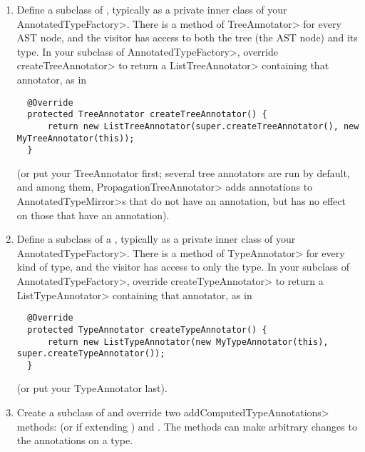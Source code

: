 \begin{enumerate}
\item
  Define a subclass of
  ,
  typically as a private inner class of your \<AnnotatedTypeFactory>.
  There is a method of \<TreeAnnotator> for every AST node, and the visitor
  has access to both the tree (the AST node) and its type.  In your
  subclass of \<AnnotatedTypeFactory>, override \<createTreeAnnotator> to
  return a \<ListTreeAnnotator> containing that annotator, as in

\begin{Verbatim}
  @Override
  protected TreeAnnotator createTreeAnnotator() {
      return new ListTreeAnnotator(super.createTreeAnnotator(), new MyTreeAnnotator(this));
  }
\end{Verbatim}

  \noindent
  (or put your TreeAnnotator first; several tree annotators are run by
  default, and among them, \<PropagationTreeAnnotator>
  adds annotations to \<AnnotatedTypeMirror>s that do not have an annotation,
  but has no effect on those that have an annotation).

\item
  Define a subclass of a
  ,
  typically as a private inner class of your \<AnnotatedTypeFactory>.
  There is a method of \<TypeAnnotator> for every kind of type, and the
  visitor has access to only the type.  In your subclass of
  \<AnnotatedTypeFactory>, override \<createTypeAnnotator> to return a
  \<ListTypeAnnotator> containing that annotator, as in

\begin{Verbatim}
  @Override
  protected TypeAnnotator createTypeAnnotator() {
      return new ListTypeAnnotator(new MyTypeAnnotator(this), super.createTypeAnnotator());
  }
\end{Verbatim}

  \noindent
  (or put your TypeAnnotator last).

\item
  Create a subclass of  and
  override two \<addComputedTypeAnnotations> methods:
  (or
  if extending )
  and
  .
  The methods can make arbitrary changes to the annotations on a type.


\end{enumerate}
